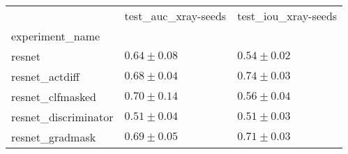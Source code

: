 \begin{tabular}{lll}
\toprule
{} & test_auc_xray-seeds & test_iou_xray-seeds \\
experiment_name      &                     &                     \\
\midrule
resnet               &       $0.64\pm0.08$ &       $0.54\pm0.02$ \\
resnet_actdiff       &       $0.68\pm0.04$ &       $0.74\pm0.03$ \\
resnet_clfmasked     &       $0.70\pm0.14$ &       $0.56\pm0.04$ \\
resnet_discriminator &       $0.51\pm0.04$ &       $0.51\pm0.03$ \\
resnet_gradmask      &       $0.69\pm0.05$ &       $0.71\pm0.03$ \\
\bottomrule
\end{tabular}
